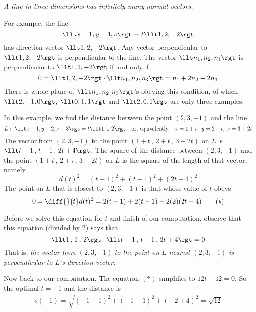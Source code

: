 \begin{warning}\label{warn line normal}
\emph{A line in three dimensions has infinitely many normal vectors.}

For example, the line
\begin{equation*}
\llt x-1,y-1,z\rgt=t\llt 1,2,-2\rgt 
\end{equation*}
has direction vector $\llt 1,2,-2\rgt$. Any vector perpendicular to 
$\llt 1,2,-2\rgt $
is perpendicular to the line. The vector $\llt n_1,n_2,n_3\rgt$ is 
perpendicular to $\llt 1,2,-2\rgt$ if and only if 
\begin{equation*}
0=\llt 1,2,-2\rgt \cdot \llt n_1,n_2,n_3\rgt = n_1+2n_2-2n_3
\end{equation*}
There is  whole plane of $\llt n_1,n_2,n_3\rgt$'s obeying this condition,
of which $\llt 2,-1,0\rgt$, $\llt 0,1,1\rgt$ and $\llt 2,0,1\rgt$ 
are only three examples.
\end{warning}

\begin{eg}\label{eg:VPdistance-point-line}
In this example, we find the distance between the point $(2,3,-1)$ and the line
\begin{equation*}
L:\  \llt x-1,y-2,z-3\rgt=t\llt 1,1,2\rgt \quad \text{or, equivalently,}\quad 
x=1+t,\ y=2+t,\ z=3+2t
\end{equation*}
The vector from $(2,3,-1)$ to the point $(1+t\,,\,2+t\,,\,3+2t)$ on $L$ is
$%
\llt t-1\,,\,t-1\,,\,2t+4\rgt$.
The square of the distance between $(2,3,-1)$ and the point 
$(1+t\,,\,2+t\,,\,3+2t)$  on $L$ is the square of the length of that vector, namely
\begin{equation*}
d(t)^2 = (t-1)^2 +(t-1)^2 +(2t+4)^2
\end{equation*}
The point on $L$ that is closest to $(2,3,-1)$ is that whose value of $t$
obeys
\begin{align*}
0= \diff{}{t} d(t)^2 = 2(t-1) +2(t-1) + 2(2)(2t+4)
\tag{$*$}\end{align*}

Before we solve this equation for $t$ and finish of our computation, observe
that this equation (divided by $2$) says that
\begin{equation*}
\llt 1\,,\,1\,,\,2\rgt\cdot\llt t-1\,,\,t-1\,,\, 2t+4\rgt = 0
\end{equation*}
That is, \emph{the vector from $(2,3,-1)$ to the point on $L$ nearest $(2,3,-1)$
is perpendicular to $L$'s direction vector}.

Now back to our computation. The equation $(*)$ simplifies to $12t+12=0$.
So the optimal $t=-1$ and the distance is
\begin{align*}
d(-1) =\sqrt{(-1-1)^2+(-1-1)^2+(-2+4)^2}
=\sqrt{12}
\end{align*}

\end{eg}

